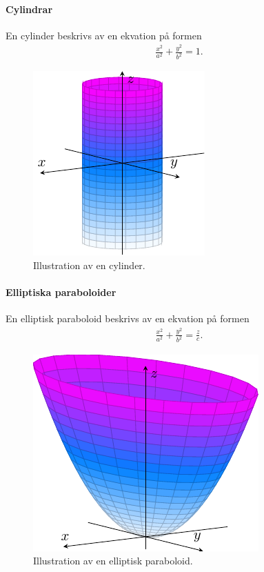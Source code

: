 \paragraph{Cylindrar}
En cylinder beskrivs av en ekvation på formen
\begin{align*}
	\frac{x^2}{a^2} + \frac{y^2}{b^2} = 1.
\end{align*}

\begin{figure}[!ht]
	\centering
	\includegraphics[scale=1]{./Images/quadric_surfaces/cylinder/cylinder.pdf}
	\caption{Illustration av en cylinder.}
	\label{fig:cylinder}
\end{figure}

\paragraph{Elliptiska paraboloider}
En elliptisk paraboloid beskrivs av en ekvation på formen
\begin{align*}
	\frac{x^2}{a^2} + \frac{y^2}{b^2} = \frac{z}{c}.
\end{align*}

\begin{figure}[!ht]
	\centering
	\includegraphics[scale=1]{./Images/quadric_surfaces/elliptic_paraboloid/elliptic_paraboloid.pdf}
	\caption{Illustration av en elliptisk paraboloid.}
	\label{fig:elliptic_paraboloid}
\end{figure}

